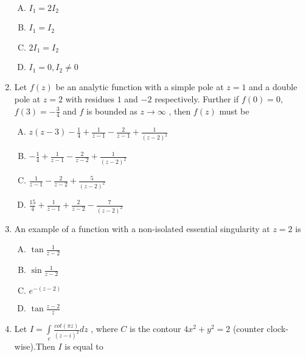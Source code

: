 \documentclass[12pt,a4paper]{article}
\begin{document}
\begin{enumerate}
\begin{enumerate}[(A)]

\item $
I_{1}=2I_{2}
$

\item $
I_{1}=I_{2}
$

\item $
2I_{1}=I_{2}
$

\item $
I_{1}=0, I_{2} \neq 0
$

\end{enumerate}

\item Let $f(z)$ be an analytic function with a simple pole at $z=1$ and a double pole at $z=2$ with residues $1$ and $-2$ respectively. Further if $f(0)=0$, $f(3)=-\frac{3}{4}$ and $f$ is bounded as $z\rightarrow \infty $ , then $f(z)$ must be

\begin{enumerate}[(A)]

\item $
z(z-3)-\frac{1}{4}+\frac{1}{z-1}-\frac{2}{z-1}+\frac{1}{(z-2)^2}
$

\item $
-\frac{1}{4}+\frac{1}{z-1}-\frac{2}{z-2}+\frac{1}{(z-2)^2}
$

\item $
\frac{1}{z-1}-\frac{2}{z-2}+\frac{5}{(z-2)^2}
$

\item $
\frac{15}{4}+\frac{1}{z-1}+\frac{2}{z-2}-\frac{7}{(z-2)^2}
$

\end{enumerate}

\item An example of a function with a non-isolated essential singularity at $z=2$ is

\begin{enumerate}[(A)]

\item $
\tan \frac{1}{z-2}
$

\item $
\sin \frac{1}{z-2}
$

\item $
e^{-(z-2)}
$

\item $
\tan \frac{z-2}{z}
$

\end{enumerate}

\item Let $I= \int\limits_{c}\frac{cot(\pi z)}{(z-i)^2}dz$ , where $C$ is the contour $4x^2+y^2=2$ (counter clock-wise).Then $I$ is equal to


\end{enumerate}
\end{document}
